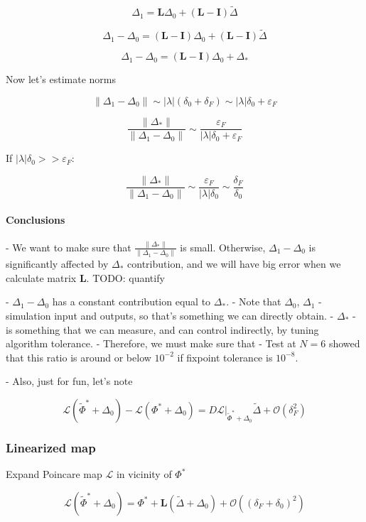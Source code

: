 \documentclass[a4paper,12pt]{article}
\newcommand{\wt}{\widetilde} %
\newcommand{\FP}{\Phi^*}%
\newcommand{\D}{\Delta}%
\begin{document}
$$
\D_1
=  \mathbf{L}   \D_0  + (\mathbf{L} - \mathbf{I}) \wt{\D}
$$

$$
\D_1 - \D_0
=  (\mathbf{L} - \mathbf{I})  \D_0  + (\mathbf{L} - \mathbf{I}) \wt \D
$$

$$
\D_1 - \D_0
=  (\mathbf{L} - \mathbf{I})  \D_0  + \D_*
$$

Now let's estimate norms

$$
\lVert \D_1 - \D_0 \rVert
\sim
|\lambda|(\delta_0 + \delta_F)
\sim
|\lambda|\delta_0 + \varepsilon_F
$$

$$
\frac{ \lVert \D_* \rVert }  {\lVert \D_1 - \D_0 \rVert }
\sim
\frac{ \varepsilon_F } { |\lambda| \delta_0 + \varepsilon_F}
$$

If $|\lambda| \delta_0 >>  \varepsilon_{F}:$

$$
\frac{ \lVert \D_* \rVert }  {\lVert \D_1 - \D_0 \rVert }
\sim
\frac{ \varepsilon_F } { |\lambda| \delta_0}
\sim
\frac{ \delta_F } {  \delta_0 }
$$


\paragraph*{Conclusions}
- We want to make sure that $\frac{ \lVert \D_* \rVert }  {\lVert \D_1 - \D_0 \rVert } $ is small. Otherwise, $\D_1 - \D_0$ is significantly affected by $\D_*$ contribution, and we will have big error when we calculate matrix $\mathbf{L}$. TODO: quantify

- $\D_1 - \D_0$ has a constant contribution equal to $\D_*$.
- Note that $\D_0$, $\D_1$ - simulation input and outputs, so that's something we can directly obtain.
- $ \D_* $ - is something that we can measure, and can control indirectly, by tuning
  algorithm tolerance.
- Therefore, we must make sure that
  - Test at $N=6$ showed that this ratio is around or below $10^{-2}$ if fixpoint tolerance is $10^{-8}$.

- Also, just for fun, let's note

$$
 \mathcal{L}(\wt \FP  + \D_0) - \mathcal{L}( \FP  + \D_0) = D\mathcal{L} \vert_{\wt \FP  + \D_0} \wt \D + \mathcal{O}(\delta_F^2)
$$


\subsubsection*{Linearized map}
Expand Poincare map $\mathcal{L}$ in vicinity of $\FP$

$$
\mathcal{L}(\wt \FP+ \D_0)
= \FP +  \mathbf{L}  ( \wt \D +  \D_0 ) + \mathcal{O}(( \delta_F + \delta_0)^2)
$$ %
\end{document}
